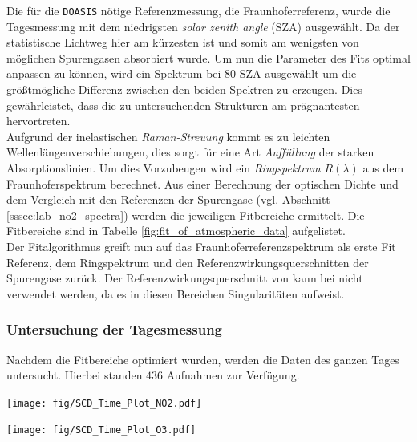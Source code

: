 \documentclass[12pt, a4paper, bibliography=totoc]{scrartcl}
\begin{document}
\begin{multicols}{2}
Die für die \verb*+DOASIS+ nötige Referenzmessung, die Fraunhoferreferenz, wurde die Tagesmessung mit dem niedrigsten
\textit{solar zenith angle} (SZA) ausgewählt. 
Da der statistische Lichtweg hier am kürzesten ist und somit am wenigsten von möglichen Spurengasen absorbiert wurde.
Um nun die Parameter des Fits optimal anpassen zu können, wird ein Spektrum bei $80$ SZA ausgewählt um die größtmögliche Differenz zwischen den beiden Spektren zu erzeugen. 
Dies gewährleistet, dass die zu untersuchenden Strukturen am prägnantesten hervortreten. \\
Aufgrund der inelastischen \textit{Raman-Streuung} kommt es zu leichten Wellenlängenverschiebungen, dies sorgt für eine Art \textit{Auffüllung} der starken Absorptionslinien.
Um dies Vorzubeugen wird ein \textit{Ringspektrum} $R(\lambda)$ aus dem Fraunhoferspektrum berechnet.
Aus einer Berechnung der optischen Dichte und dem Vergleich mit den Referenzen der Spurengase (vgl. Abschnitt \ref{sssec:lab_no2_spectra}) werden die jeweiligen Fitbereiche ermittelt. 
Die Fitbereiche sind in Tabelle \ref{fig:fit_of_atmospheric_data} aufgelistet.\\
Der Fitalgorithmus greift nun auf das Fraunhoferreferenzspektrum als erste Fit Referenz, dem Ringspektrum und den Referenzwirkungsquerschnitten der Spurengase zurück. 
Der Referenzwirkungsquerschnitt von  kann bei  nicht verwendet werden, da es in diesen Bereichen Singularitäten aufweist.

\subsubsection{Untersuchung der Tagesmessung}\label{sssec:tagesmessung}

Nachdem die Fitbereiche optimiert wurden, werden die Daten des ganzen Tages untersucht. 
Hierbei standen $436$ Aufnahmen zur Verfügung.


\begin{center}
	\texttt{[image: fig/SCD\_Time\_Plot\_NO2.pdf]}
	\label{fig:delta_SCD_time_NO2}
\end{center}
       
\begin{center}
	\texttt{[image: fig/SCD\_Time\_Plot\_O3.pdf]}
	\label{fig:delta_SCD_time_O3}
\end{center}       


\end{multicols}
\end{document}

